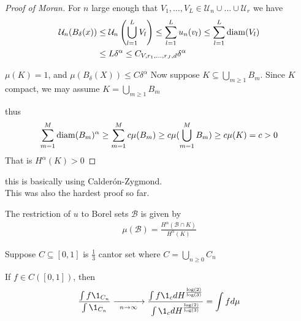 \begin{proof}[Proof of Moran]
For $n$ large enough that $V_{1}, \ldots, V_{L} \in \mathcal{U}_{n} \cup \ldots \cup \mathcal{U}_r$ we have
\begin{align*}
	\mathcal{U}_{n} (B_{\delta}(x)) &\leq \mathcal{U}_{n} \left( \bigcup_{l=1}^{L} V_{l} \right)
									\leq \sum_{l=1}^{L} u_{n} (v_{l}) \leq \sum_{l=1}^{L} \operatorname*{diam} (V_{l}) \\
									&\leq L \delta^{\alpha} \leq C_{V, r_{1}, \ldots, r_{J} , d	} \delta^{\alpha}
\end{align*} 

$\mu (K) = 1$, and $\mu (B_{\delta} (X)) \leq C \delta^{\alpha}$ 
Now suppose $K \subseteq \bigcup_{m \geq 1} B_{m}$. Since $K$ compact, we may assume $K = \bigcup_{m \geq 1} B_{m}$

thus
\begin{align*}
	\sum_{m=1}^{M} \operatorname*{diam}(B_{m})^{\alpha} \geq \sum_{m=1}^{M} c \mu(B_{m}) \geq c \mu (\bigcup_{m=1}^{M} B_{m}) \geq c \mu (K) = c > 0
\end{align*} 
That is $H^{\alpha} (K) > 0$

\end{proof}


\begin{remark}
	this is basically using Calder\'{o}n-Zygmond. \\
	This was also the hardest proof so far.
\end{remark}

\begin{example}
	The restriction of $u$ to Borel sets $\mathcal{B}$ is given by
	\begin{align*}
		\mu ( \mathcal{B} ) = \frac{H^{\alpha} (\mathcal{B} \cap K)}{H^{\alpha} (K)}
	\end{align*} 
\end{example}

\begin{exercise}
	Suppose $C \subseteq  [0,1]$ is $\frac{1}{3}$ cantor set where $C = \bigcup_{n \geq 0} C_{n}$

	If $f \in C([0,1])$, then
	\begin{align*}
		\frac{\int f \1_{C_n}}{\int \1_{C_n}}  \xrightarrow[\enskip n \to \infty\enskip]{} 
		\frac{\int f \1_{c} d H^{\frac{\log(2)}{\log(3)}}}{\int \1_{c} d H^{\frac{\log(2)}{\log(3)}}}
	= \int f d\mu
	\end{align*} 
\end{exercise}



